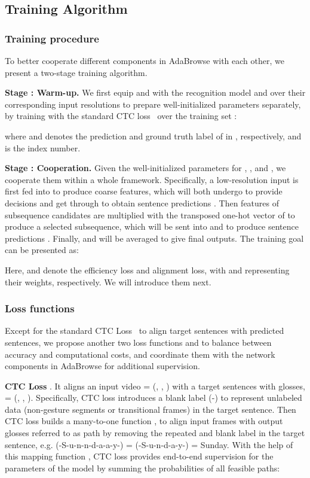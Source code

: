 \documentclass[sigconf]{acmart}
\begin{document}
\subsection{Training Algorithm}
\subsubsection{Training procedure}
To better cooperate different components in AdaBrowse with each other, we present a two-stage training algorithm.
  
\textbf{Stage \uppercase\expandafter{}: Warm-up.} We first equip  and  with the recognition model  and  over their corresponding input resolutions to prepare well-initialized parameters separately, by training with the standard CTC loss~\cite{graves2006connectionist} over the training set : 
  
where  and  denotes the prediction and ground truth label of  in , respectively, and  is the index number.   
  
\textbf{Stage \uppercase\expandafter{}: Cooperation.}
Given the well-initialized parameters for , ,  and , we cooperate them within a whole framework. Specifically, a low-resolution input is first fed into  to produce coarse features, which will both undergo  to provide decisions  and get through  to obtain sentence predictions . Then features of  subsequence candidates are multiplied with the transposed one-hot vector of  to produce a selected subsequence, which will be sent into  and  to produce sentence predictions . Finally,  and  will be averaged to give final outputs. The training goal can be presented as: 
  
  Here,  and  denote the efficiency loss and alignment loss, with  and  representing their weights, respectively. We will introduce them next.
\subsubsection{Loss functions}
Except for the standard CTC Loss~\cite{graves2006connectionist} to align target sentences with predicted sentences, we propose another two loss functions  and  to balance between accuracy and computational costs, and coordinate them with the network components in AdaBrowse for additional supervision.

\textbf{CTC Loss} . It aligns an input video  = (, , ) with a target sentences with  glosses,  = (, , ). Specifically, CTC loss introduces a blank label (-) to represent unlabeled data (non-gesture segments or transitional frames) in the target sentence. Then CTC loss builds a many-to-one function , to align input frames with output glosses referred to as path  by removing the repeated and blank label in the target sentence, e.g. (-S-u-n-n-d-a-a-y-) = (-S-u-n-d-a-y-) = Sunday. With the help of this mapping function , CTC loss provides end-to-end supervision for the parameters of the model by summing the probabilities of all feasible paths:
\end{document}
